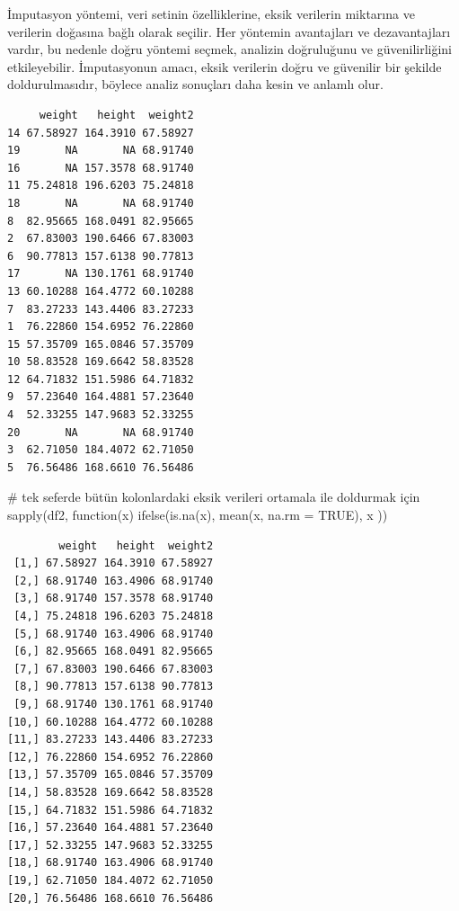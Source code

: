 \documentclass[
  letterpaper,
  DIV=11,
  numbers=noendperiod]{scrreprt}
\newenvironment{Shaded}{\begin{snugshade}}{\end{snugshade}}
\newcommand{\AttributeTok}[1]{\textcolor[rgb]{0.40,0.45,0.13}{#1}}
\newcommand{\CommentTok}[1]{\textcolor[rgb]{0.37,0.37,0.37}{#1}}
\newcommand{\ConstantTok}[1]{\textcolor[rgb]{0.56,0.35,0.01}{#1}}
\newcommand{\ControlFlowTok}[1]{\textcolor[rgb]{0.00,0.23,0.31}{#1}}
\newcommand{\FunctionTok}[1]{\textcolor[rgb]{0.28,0.35,0.67}{#1}}
\newcommand{\NormalTok}[1]{\textcolor[rgb]{0.00,0.23,0.31}{#1}}
\newcommand{\OtherTok}[1]{\textcolor[rgb]{0.00,0.23,0.31}{#1}}
\newcommand{\SpecialCharTok}[1]{\textcolor[rgb]{0.37,0.37,0.37}{#1}}
\begin{document}
İmputasyon yöntemi, veri setinin özelliklerine, eksik verilerin
miktarına ve verilerin doğasına bağlı olarak seçilir. Her yöntemin
avantajları ve dezavantajları vardır, bu nedenle doğru yöntemi seçmek,
analizin doğruluğunu ve güvenilirliğini etkileyebilir. İmputasyonun
amacı, eksik verilerin doğru ve güvenilir bir şekilde doldurulmasıdır,
böylece analiz sonuçları daha kesin ve anlamlı olur.

\begin{Shaded}
\end{Shaded}

\begin{verbatim}
     weight   height  weight2
14 67.58927 164.3910 67.58927
19       NA       NA 68.91740
16       NA 157.3578 68.91740
11 75.24818 196.6203 75.24818
18       NA       NA 68.91740
8  82.95665 168.0491 82.95665
2  67.83003 190.6466 67.83003
6  90.77813 157.6138 90.77813
17       NA 130.1761 68.91740
13 60.10288 164.4772 60.10288
7  83.27233 143.4406 83.27233
1  76.22860 154.6952 76.22860
15 57.35709 165.0846 57.35709
10 58.83528 169.6642 58.83528
12 64.71832 151.5986 64.71832
9  57.23640 164.4881 57.23640
4  52.33255 147.9683 52.33255
20       NA       NA 68.91740
3  62.71050 184.4072 62.71050
5  76.56486 168.6610 76.56486
\end{verbatim}

\begin{Shaded}
\begin{Highlighting}[]
\CommentTok{\# tek seferde bütün kolonlardaki eksik verileri ortamala ile doldurmak için}
\FunctionTok{sapply}\NormalTok{(df2, }\ControlFlowTok{function}\NormalTok{(x) }\FunctionTok{ifelse}\NormalTok{(}\FunctionTok{is.na}\NormalTok{(x), }\FunctionTok{mean}\NormalTok{(x, }\AttributeTok{na.rm =} \ConstantTok{TRUE}\NormalTok{), x ))}
\end{Highlighting}
\end{Shaded}

\begin{verbatim}
        weight   height  weight2
 [1,] 67.58927 164.3910 67.58927
 [2,] 68.91740 163.4906 68.91740
 [3,] 68.91740 157.3578 68.91740
 [4,] 75.24818 196.6203 75.24818
 [5,] 68.91740 163.4906 68.91740
 [6,] 82.95665 168.0491 82.95665
 [7,] 67.83003 190.6466 67.83003
 [8,] 90.77813 157.6138 90.77813
 [9,] 68.91740 130.1761 68.91740
[10,] 60.10288 164.4772 60.10288
[11,] 83.27233 143.4406 83.27233
[12,] 76.22860 154.6952 76.22860
[13,] 57.35709 165.0846 57.35709
[14,] 58.83528 169.6642 58.83528
[15,] 64.71832 151.5986 64.71832
[16,] 57.23640 164.4881 57.23640
[17,] 52.33255 147.9683 52.33255
[18,] 68.91740 163.4906 68.91740
[19,] 62.71050 184.4072 62.71050
[20,] 76.56486 168.6610 76.56486
\end{verbatim}
\end{document}
